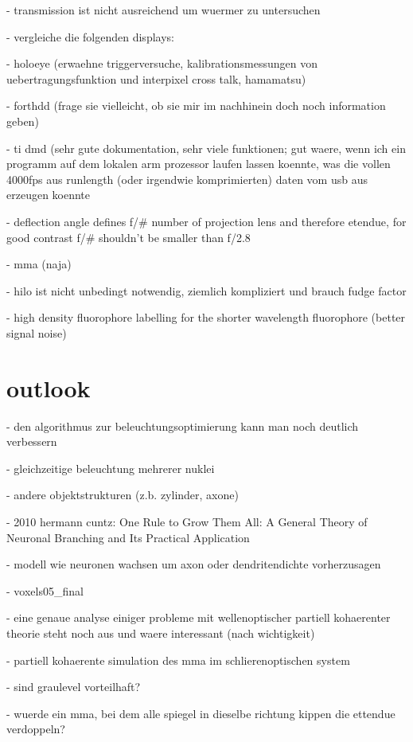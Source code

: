 \documentclass[oneside,a4paper,12pt,BCOR20mm,DIV14]{scrbook} %
\begin{document}
- transmission ist nicht ausreichend um wuermer zu untersuchen  

- vergleiche die folgenden displays:

  - holoeye (erwaehne triggerversuche, kalibrationsmessungen von
    uebertragungsfunktion und interpixel cross talk, hamamatsu)

  - forthdd (frage sie vielleicht, ob sie mir im nachhinein doch noch
    information geben)

  - ti dmd (sehr gute dokumentation, sehr viele funktionen; gut waere,
    wenn ich ein programm auf dem lokalen arm prozessor laufen lassen
    koennte, was die vollen 4000fps aus runlength (oder irgendwie
    komprimierten) daten vom usb aus erzeugen koennte

    - deflection angle defines f/\# number of projection lens and
      therefore etendue, for good contrast f/\# shouldn't be smaller
      than f/2.8

  - mma (naja)

- hilo ist nicht unbedingt notwendig, ziemlich kompliziert und brauch
  fudge factor

  - high density fluorophore labelling for the shorter wavelength
  fluorophore (better signal noise)

\chapter{outlook}
\label{sec:outlook}
- den algorithmus zur beleuchtungsoptimierung kann man noch deutlich
  verbessern

  - gleichzeitige beleuchtung mehrerer nuklei

  - andere objektstrukturen (z.b. zylinder, axone)

    - 2010 hermann cuntz: One Rule to Grow Them All: A General Theory
      of Neuronal Branching and Its Practical Application

      - modell wie neuronen wachsen um axon oder dendritendichte
        vorherzusagen

  - voxels05\_final

- eine genaue analyse einiger probleme mit wellenoptischer partiell
  kohaerenter theorie steht noch aus und waere interessant (nach
  wichtigkeit)

  - partiell kohaerente simulation des mma im schlierenoptischen system

    - sind graulevel vorteilhaft?

    - wuerde ein mma, bei dem alle spiegel in dieselbe richtung kippen
      die ettendue verdoppeln?
\end{document}
